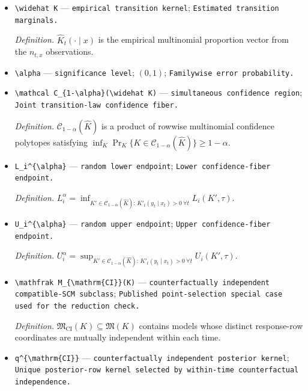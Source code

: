 \documentclass{article}
\begin{document}
\begin{itemize}
  \item \texttt{\textbackslash{}\allowbreak{}widehat K} --- \texttt{empirical transition kernel}; \texttt{Estimated transition marginals.}
  \par\smallskip\noindent\emph{Definition.} \(\widehat K_t(\cdot\mid x)\) is the empirical multinomial proportion vector from the \(n_{t,x}\) observations.
  \item \texttt{\textbackslash{}\allowbreak{}alpha} --- \texttt{significance level}; \((0,1)\); \texttt{Familywise error probability.}
  \item \texttt{\textbackslash{}\allowbreak{}mathcal C\_\allowbreak{}\{1-\allowbreak{}\textbackslash{}\allowbreak{}alpha\}\allowbreak{}(\textbackslash{}\allowbreak{}widehat K)} --- \texttt{simultaneous confidence region}; \texttt{Joint transition-\allowbreak{}law confidence fiber.}
  \par\smallskip\noindent\emph{Definition.} \(\mathcal C_{1-\alpha}(\widehat K)\) is a product of rowwise multinomial confidence polytopes satisfying \(\inf_K\Pr_K\{K\in\mathcal C_{1-\alpha}(\widehat K)\}\ge 1-\alpha\).
  \item \texttt{L\_\allowbreak{}i\textasciicircum{}\{\textbackslash{}\allowbreak{}alpha\}\allowbreak{}} --- \texttt{random lower endpoint}; \texttt{Lower confidence-\allowbreak{}fiber endpoint.}
  \par\smallskip\noindent\emph{Definition.} \(L_i^{\alpha}=\inf_{K'\in\mathcal C_{1-\alpha}(\widehat K):\,K'_t(y_t\mid x_t)>0\ \forall t}L_i(K',\tau)\).
  \item \texttt{U\_\allowbreak{}i\textasciicircum{}\{\textbackslash{}\allowbreak{}alpha\}\allowbreak{}} --- \texttt{random upper endpoint}; \texttt{Upper confidence-\allowbreak{}fiber endpoint.}
  \par\smallskip\noindent\emph{Definition.} \(U_i^{\alpha}=\sup_{K'\in\mathcal C_{1-\alpha}(\widehat K):\,K'_t(y_t\mid x_t)>0\ \forall t}U_i(K',\tau)\).
  \item \texttt{\textbackslash{}\allowbreak{}mathfrak M\_\allowbreak{}\{\textbackslash{}\allowbreak{}mathrm\{CI\}\allowbreak{}\}\allowbreak{}(K)} --- \texttt{counterfactually independent compatible-\allowbreak{}SCM subclass}; \texttt{Published point-\allowbreak{}selection special case used for the reduction check.}
  \par\smallskip\noindent\emph{Definition.} \(\mathfrak M_{\mathrm{CI}}(K)\subseteq\mathfrak M(K)\) contains models whose distinct response-row coordinates are mutually independent within each time.
  \item \texttt{q\textasciicircum{}\{\textbackslash{}\allowbreak{}mathrm\{CI\}\allowbreak{}\}\allowbreak{}} --- \texttt{counterfactually independent posterior kernel}; \texttt{Unique posterior-\allowbreak{}row kernel selected by within-\allowbreak{}time counterfactual independence.}

\end{itemize}
\end{document}
